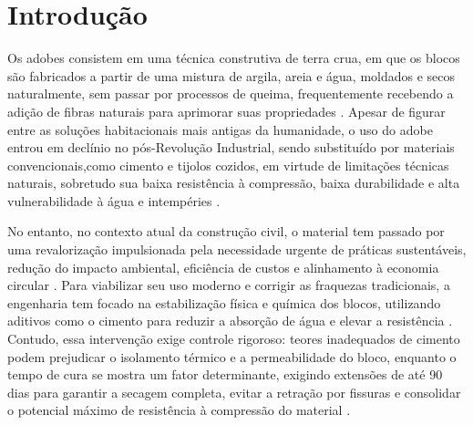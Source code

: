 \newpage

\section[INTRODUÇÃO]{Introdução}



    Os adobes consistem em uma técnica construtiva de terra crua, em que os blocos são fabricados a partir de uma mistura de argila, areia e água, moldados e secos naturalmente, sem passar por processos de queima, frequentemente recebendo a adição de fibras naturais para aprimorar suas propriedades \cite{Bailly2024, Junior2020, Dormohamadi2024, Morel2021}. Apesar de figurar entre as soluções habitacionais mais antigas da humanidade, o uso do adobe entrou em declínio no pós-Revolução Industrial, sendo substituído por materiais convencionais,como cimento e tijolos cozidos, em virtude de limitações técnicas naturais, sobretudo sua baixa resistência à compressão, baixa durabilidade e alta vulnerabilidade à água e intempéries \cite{Junior2020, Morel2021, Rocco2024, Sharma2016, VanDerLinden2019}.
    
    No entanto, no contexto atual da construção civil, o material tem passado por uma revalorização impulsionada pela necessidade urgente de práticas sustentáveis, redução do impacto ambiental, eficiência de custos e alinhamento à economia circular \cite{Bailly2024, Morel2021, VanDerLinden2019}. Para viabilizar seu uso moderno e corrigir as fraquezas tradicionais, a engenharia tem focado na estabilização física e química dos blocos, utilizando aditivos como o cimento para reduzir a absorção de água e elevar a resistência \cite{Bailly2024, Dormohamadi2024, Sharma2016, Kariyawasam2016}. Contudo, essa intervenção exige controle rigoroso: teores inadequados de cimento podem prejudicar o isolamento térmico e a permeabilidade do bloco, enquanto o tempo de cura se mostra um fator determinante, exigindo extensões de até 90 dias para garantir a secagem completa, evitar a retração por fissuras e consolidar o potencial máximo de resistência à compressão do material \cite{Bailly2024}.

